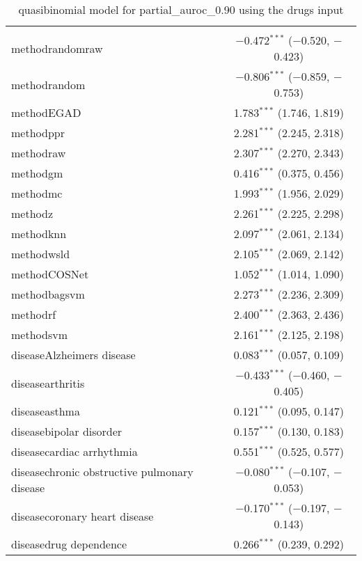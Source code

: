 
\begin{table}[!htbp] \centering 
  \caption{quasibinomial model for partial_auroc_0.90 using the drugs input} 
  \label{} 
\begin{tabular}{@{\extracolsep{5pt}}lc} 
\\[-1.8ex]\hline 
\hline \\[-1.8ex] 
 methodrandomraw & $-$0.472$^{***}$ ($-$0.520, $-$0.423) \\ 
  methodrandom & $-$0.806$^{***}$ ($-$0.859, $-$0.753) \\ 
  methodEGAD & 1.783$^{***}$ (1.746, 1.819) \\ 
  methodppr & 2.281$^{***}$ (2.245, 2.318) \\ 
  methodraw & 2.307$^{***}$ (2.270, 2.343) \\ 
  methodgm & 0.416$^{***}$ (0.375, 0.456) \\ 
  methodmc & 1.993$^{***}$ (1.956, 2.029) \\ 
  methodz & 2.261$^{***}$ (2.225, 2.298) \\ 
  methodknn & 2.097$^{***}$ (2.061, 2.134) \\ 
  methodwsld & 2.105$^{***}$ (2.069, 2.142) \\ 
  methodCOSNet & 1.052$^{***}$ (1.014, 1.090) \\ 
  methodbagsvm & 2.273$^{***}$ (2.236, 2.309) \\ 
  methodrf & 2.400$^{***}$ (2.363, 2.436) \\ 
  methodsvm & 2.161$^{***}$ (2.125, 2.198) \\ 
  diseaseAlzheimers disease & 0.083$^{***}$ (0.057, 0.109) \\ 
  diseasearthritis & $-$0.433$^{***}$ ($-$0.460, $-$0.405) \\ 
  diseaseasthma & 0.121$^{***}$ (0.095, 0.147) \\ 
  diseasebipolar disorder & 0.157$^{***}$ (0.130, 0.183) \\ 
  diseasecardiac arrhythmia & 0.551$^{***}$ (0.525, 0.577) \\ 
  diseasechronic obstructive pulmonary disease & $-$0.080$^{***}$ ($-$0.107, $-$0.053) \\ 
  diseasecoronary heart disease & $-$0.170$^{***}$ ($-$0.197, $-$0.143) \\ 
  diseasedrug dependence & 0.266$^{***}$ (0.239, 0.292) \\ 

\end{tabular}
\end{table}
